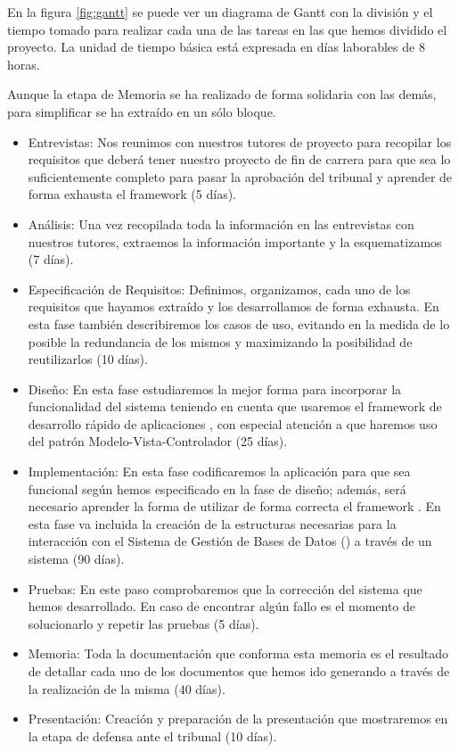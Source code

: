 En la figura \ref{fig:gantt} se puede ver un diagrama de Gantt con la división y
el tiempo tomado para realizar cada una de las tareas en las que hemos dividido
el proyecto. La unidad de tiempo básica está expresada en días laborables de 8
horas.

Aunque la etapa de Memoria se ha realizado de forma solidaria con las demás,
para simplificar se ha extraído en un sólo bloque.

\begin{itemize}
\item Entrevistas: Nos reunimos con nuestros tutores de proyecto para recopilar
  los requisitos que deberá tener nuestro proyecto de fin de carrera para que
  sea lo suficientemente completo para pasar la aprobación del tribunal y
  aprender de forma exhausta el framework  (5 días).
\item Análisis: Una vez recopilada toda la información en las entrevistas con
  nuestros tutores, extraemos la información importante y la esquematizamos (7
  días).
\item Especificación de Requisitos: Definimos, organizamos, cada uno de los
  requisitos que hayamos extraído y los desarrollamos de forma exhausta. En esta
  fase también describiremos los casos de uso, evitando en la medida de lo
  posible la redundancia de los mismos y maximizando la posibilidad de
  reutilizarlos (10 días).
\item Diseño: En esta fase estudiaremos la mejor forma para incorporar la
  funcionalidad del sistema teniendo en cuenta que usaremos el framework de
  desarrollo rápido de aplicaciones , con especial
  atención a que haremos uso del patrón Modelo-Vista-Controlador (25 días).
\item Implementación: En esta fase codificaremos la aplicación para que sea
  funcional según hemos especificado en la fase de diseño; además, será
  necesario aprender la forma de utilizar de forma correcta el framework
  . En esta fase va incluida la creación de la
  estructuras necesarias para la interacción con el Sistema de Gestión de Bases
  de Datos () a través de un sistema  (90 días).
\item Pruebas: En este paso comprobaremos que la corrección del sistema que
  hemos desarrollado. En caso de encontrar algún fallo es el momento de
  solucionarlo y repetir las pruebas (5 días).
\item Memoria: Toda la documentación que conforma esta memoria es el resultado
  de detallar cada uno de los documentos que hemos ido generando a través de la
  realización de la misma (40 días).
\item Presentación: Creación y preparación de la presentación que mostraremos en
  la etapa de defensa ante el tribunal (10 días).
\end{itemize}

